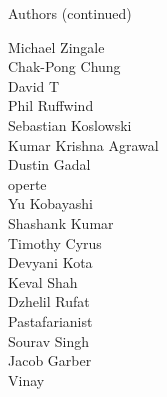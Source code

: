 \begin{frame}{Authors (continued)}
\begin{multicols}{5}
Michael Zingale\\
Chak-Pong Chung\\
David T\\
Phil Ruffwind\\
Sebastian Koslowski\\
Kumar Krishna Agrawal\\
Dustin Gadal\\
operte\\
Yu Kobayashi\\
Shashank Kumar\\
Timothy Cyrus\\
Devyani Kota\\
Keval Shah\\
Dzhelil Rufat\\
Pastafarianist\\
Sourav Singh\\
Jacob Garber\\
Vinay\\
\end{multicols}
\end{frame}

